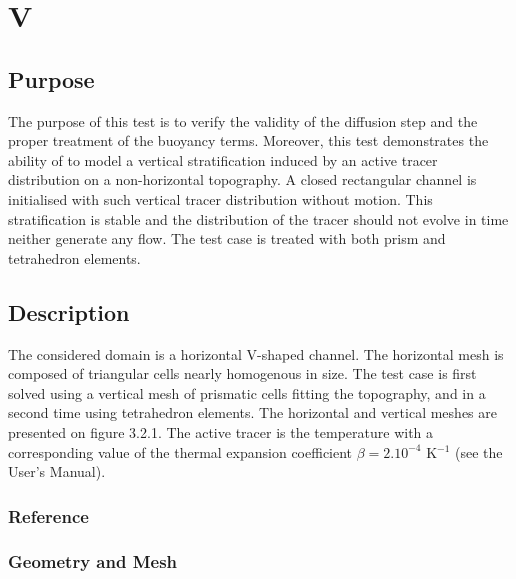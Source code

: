 \chapter{V}
%
%
\section{Purpose}
%
The purpose of this test is to verify the validity of the diffusion step
and the proper treatment of the buoyancy terms.
Moreover, this test demonstrates the ability of  to model
a vertical stratification induced by an active tracer distribution
on a non-horizontal topography.
A closed rectangular channel is initialised with such vertical tracer
distribution without motion.
This stratification is stable and the distribution of the tracer should
not evolve in time neither generate any flow.
The test case is treated with both prism and tetrahedron elements.
%
\section{Description}
%
The considered domain is a horizontal V-shaped channel.
The horizontal mesh is composed of triangular cells nearly homogenous in
size.
The test case is first solved using a vertical mesh of prismatic cells
fitting the topography, and in a second time using tetrahedron elements.
The horizontal and vertical meshes are presented on figure 3.2.1.
The active tracer is the temperature with a corresponding value of the
thermal expansion coefficient $\beta = 2.10^{-4}$ K$^{-1}$
(see the User's Manual).
%
%
%
%
\subsection{Reference}
%

%
%
%
\subsection{Geometry and Mesh}
%
